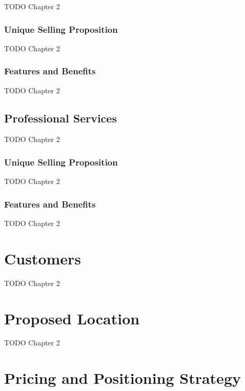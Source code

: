 TODO Chapter 2

\subsubsection*{Unique Selling Proposition}

TODO Chapter 2

\subsubsection*{Features and Benefits}

TODO Chapter 2


\subsection{Professional Services}

TODO Chapter 2

\subsubsection*{Unique Selling Proposition}

TODO Chapter 2

\subsubsection*{Features and Benefits}

TODO Chapter 2


\section{Customers}

TODO Chapter 2


\section{Proposed Location}

TODO Chapter 2


\section{Pricing and Positioning Strategy}

